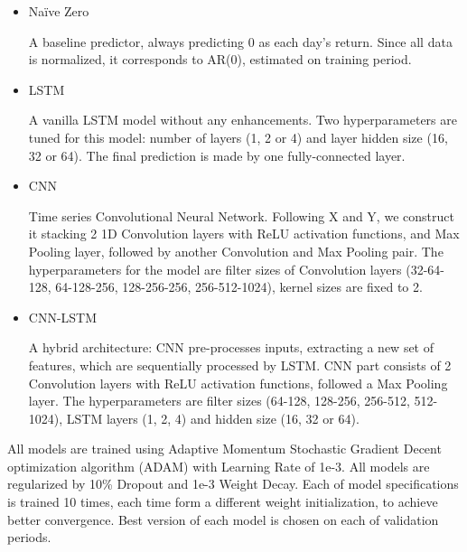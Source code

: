 \documentclass[review, authoryear]{elsarticle}
\begin{document}
\begin{itemize}

\item Naïve Zero

A baseline predictor, always predicting 0 as each day's return. Since all data is normalized, it corresponds to AR(0), estimated on training period.

\item LSTM

A vanilla LSTM model without any enhancements. Two hyperparameters are tuned for this model: number of layers (1, 2 or 4) and layer hidden size (16, 32 or 64). The final prediction is made by one fully-connected layer.

\item CNN

Time series Convolutional Neural Network. Following X and Y, we construct it stacking 2 1D Convolution layers with ReLU activation functions, and Max Pooling layer, followed by another Convolution and Max Pooling pair. The hyperparameters for the model are filter sizes of Convolution layers (32-64-128, 64-128-256, 128-256-256, 256-512-1024), kernel sizes are fixed to 2.

\item CNN-LSTM

A hybrid architecture: CNN pre-processes inputs, extracting a new set of features, which are sequentially processed by LSTM. CNN part consists of 2 Convolution layers with ReLU activation functions, followed a Max Pooling layer. The hyperparameters are filter sizes (64-128, 128-256, 256-512, 512-1024), LSTM layers (1, 2, 4) and hidden size (16, 32 or 64).

\end{itemize}

All models are trained using Adaptive Momentum Stochastic Gradient Decent optimization algorithm (ADAM) with Learning Rate of 1e-3. All models are regularized by 10\% Dropout and 1e-3 Weight Decay.
Each of model specifications is trained 10 times, each time form a different weight initialization, to achieve better convergence. Best version of each model is chosen on each of validation periods.
\end{document}
